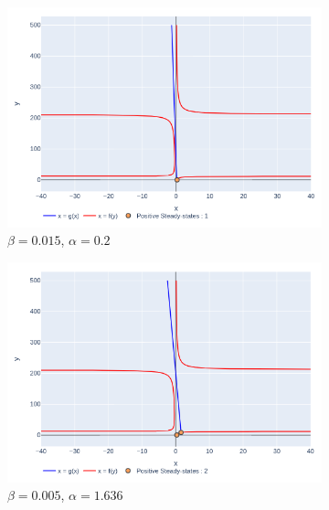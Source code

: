\documentclass[12pt]{article}
\begin{document}
\begin{figure}[!ht]
    \centering
    \begin{subfigure}[b]{0.49\textwidth}
         \centering
         \includegraphics[width=\textwidth]{figures/fig_isocline_2.png}
         \caption{$\beta = 0.015$, $\alpha=0.2$}
         \label{fig::nuclline 1 ss}
     \end{subfigure}
     \hfill
    \begin{subfigure}[b]{0.49\textwidth}
         \centering
         \includegraphics[width=\textwidth]{figures/fig_isocline_1.png}
         \caption{$\beta = 0.005$, $\alpha=1.636$}
         \label{fig::nuclline 2 ss}
     \end{subfigure}\\
     \begin{subfigure}[b]{0.49\textwidth}
         \centering

\end{subfigure}
\end{figure}
\end{document}
